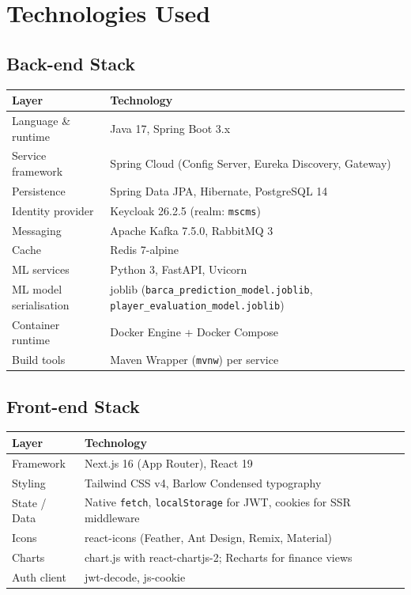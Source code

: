 \documentclass[12pt,a4paper,oneside]{report}
\begin{document}
\chapter{Technologies Used}
\label{ch:tech}

\section{Back-end Stack}
\begin{longtable}{p{} p{}}
  \toprule
  \textbf{Layer} & \textbf{Technology} \\
  \midrule
  Language \& runtime & Java 17, Spring Boot 3.x \\
  Service framework & Spring Cloud (Config Server, Eureka Discovery, Gateway) \\
  Persistence & Spring Data JPA, Hibernate, PostgreSQL 14 \\
  Identity provider & Keycloak 26.2.5 (realm: \texttt{mscms}) \\
  Messaging & Apache Kafka 7.5.0, RabbitMQ 3 \\
  Cache & Redis 7-alpine \\
  ML services & Python 3, FastAPI, Uvicorn \\
  ML model serialisation & joblib (\texttt{barca\_prediction\_model.joblib},
        \texttt{player\_evaluation\_model.joblib}) \\
  Container runtime & Docker Engine + Docker Compose \\
  Build tools & Maven Wrapper (\texttt{mvnw}) per service \\
  \bottomrule
\end{longtable}

\section{Front-end Stack}
\begin{longtable}{p{} p{}}
  \toprule
  \textbf{Layer} & \textbf{Technology} \\
  \midrule
  Framework & Next.js 16 (App Router), React 19 \\
  Styling & Tailwind CSS v4, Barlow Condensed typography \\
  State / Data & Native \texttt{fetch}, \texttt{localStorage} for JWT,
        cookies for SSR middleware \\
  Icons & react-icons (Feather, Ant Design, Remix, Material) \\
  Charts & chart.js with react-chartjs-2; Recharts for finance views \\
  Auth client & jwt-decode, js-cookie \\
  \bottomrule
\end{longtable}
\end{document}
